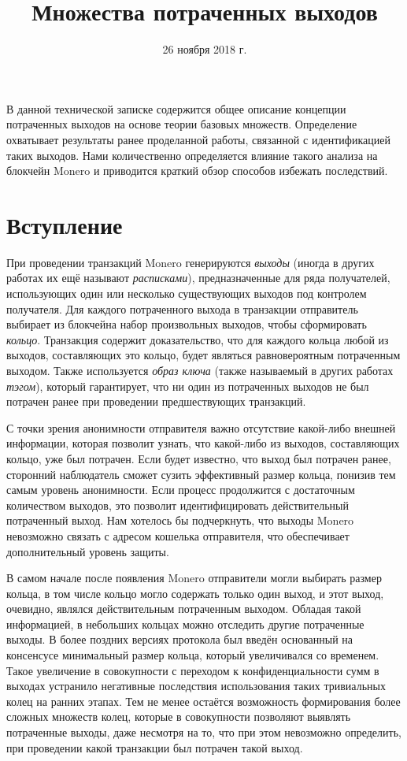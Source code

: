 \documentclass{mrl}
\title{Множества потраченных выходов}
\date{26 ноября 2018 г.}
\begin{document}
\begin{center}
{}
\end{center}

В данной технической записке содержится общее описание концепции потраченных выходов на основе теории базовых множеств. Определение охватывает результаты ранее проделанной работы, связанной с идентификацией таких выходов. Нами количественно определяется влияние такого анализа на блокчейн Monero и приводится краткий обзор способов избежать последствий.

\section{Вступление}
При проведении транзакций Monero генерируются \textit{выходы} (иногда в других работах их ещё называют \textit{расписками}), предназначенные для ряда получателей, использующих один или несколько существующих выходов под контролем получателя. Для каждого потраченного выхода в транзакции отправитель выбирает из блокчейна набор произвольных выходов, чтобы сформировать \textit{кольцо}. Транзакция содержит доказательство, что для каждого кольца любой из выходов, составляющих это кольцо, будет являться равновероятным потраченным выходом. Также используется \textit{образ ключа} (также называемый в других работах \textit{тэгом}), который гарантирует, что ни один из потраченных выходов не был потрачен ранее при проведении предшествующих транзакций.

С точки зрения анонимности отправителя важно отсутствие какой-либо внешней информации, которая позволит узнать, что какой-либо из выходов, составляющих кольцо, уже был потрачен. Если будет известно, что выход был потрачен ранее, сторонний наблюдатель сможет сузить эффективный размер кольца, понизив тем самым уровень анонимности. Если процесс продолжится с достаточным количеством выходов, это позволит идентифицировать действительный потраченный выход. Нам хотелось бы подчеркнуть, что выходы Monero невозможно связать с адресом кошелька отправителя, что обеспечивает дополнительный уровень защиты.

В самом начале после появления Monero отправители могли выбирать размер кольца, в том числе кольцо могло содержать только один выход, и этот выход, очевидно, являлся действительным потраченным выходом. Обладая такой информацией, в небольших кольцах можно отследить другие потраченные выходы. В более поздних версиях протокола был введён основанный на консенсусе минимальный размер кольца, который увеличивался со временем. Такое увеличение в совокупности с переходом к конфиденциальности сумм в выходах устранило негативные последствия использования таких тривиальных колец на ранних этапах. Тем не менее остаётся возможность формирования более сложных множеств колец, которые в совокупности позволяют выявлять потраченные выходы, даже несмотря на то, что при этом невозможно определить, при проведении какой транзакции был потрачен такой выход.
\end{document}
